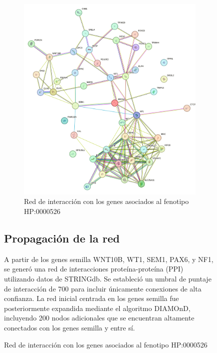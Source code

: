 \begin{figure}[h]
{\begin{figure}[h] %
	\centering
	\includegraphics[width=1\textwidth]{figures/red_interaccion_aniridia.png} %
	\caption{Red de interacción con los genes asociados al fenotipo HP:0000526} %
	\label{fig:mi-imagen} %
\end{figure}

\subsection{Propagación de la red}

A partir de los genes semilla WNT10B, WT1, SEM1, PAX6, y NF1, se generó una red de interacciones proteína-proteína (PPI) utilizando datos de STRINGdb. Se estableció un umbral de puntaje de interacción de 700 para incluir únicamente conexiones de alta confianza. La red inicial centrada en los genes semilla fue posteriormente expandida mediante el algoritmo DIAMOnD, incluyendo 200 nodos adicionales que se encuentran altamente conectados con los genes semilla y entre sí.

}
\end{figure}

